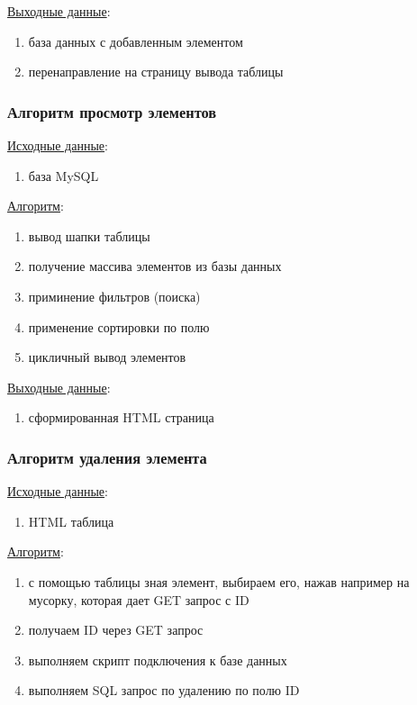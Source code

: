 \underline{Выходные данные}:
\begin{enumerate}
    \item база данных с добавленным элементом
    \item перенаправление на страницу вывода таблицы
\end{enumerate}


\subsubsection*{Алгоритм просмотр элементов}

\underline{Исходные данные}: 
\begin{enumerate}
    \item база MySQL
\end{enumerate}

\underline{Алгоритм}:
\begin{enumerate}
    \item вывод шапки таблицы
    \item получение массива элементов из базы данных
    \item приминение фильтров (поиска)
    \item применение сортировки по полю
    \item цикличный вывод элементов
\end{enumerate}

\underline{Выходные данные}:
\begin{enumerate}
    \item сформированная HTML страница
\end{enumerate}


\subsubsection*{Алгоритм удаления элемента}

\underline{Исходные данные}:
\begin{enumerate}
    \item HTML таблица
\end{enumerate}

\underline{Алгоритм}:
\begin{enumerate}
    \item с помощью таблицы зная элемент, выбираем его, нажав например на мусорку, которая дает GET запрос с ID
    \item получаем ID через GET запрос
    \item выполняем скрипт подключения к базе данных
    \item выполняем SQL запрос по удалению по полю ID
\end{enumerate}

